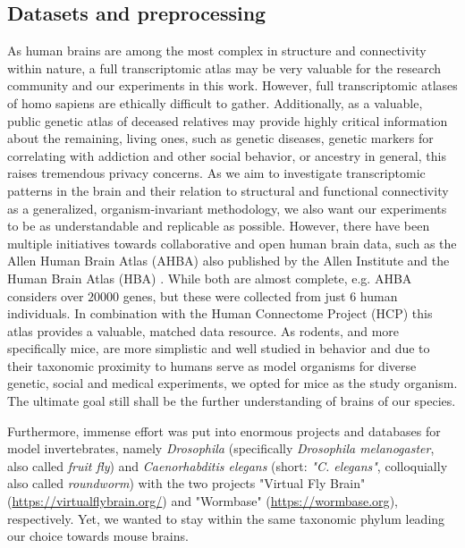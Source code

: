 \documentclass[]{article}
\renewcommand{\cite}{\citep}
\begin{document}
\subsection{Datasets and preprocessing}
\label{sec:datasets}
As human brains are among the most complex in structure and connectivity within nature, a full transcriptomic atlas may be very valuable for the research community and our experiments in this work. However, full transcriptomic atlases of homo sapiens are ethically difficult to gather. Additionally, as a valuable, public genetic atlas of deceased relatives may provide highly critical information about the remaining, living ones, such as genetic diseases, genetic markers for correlating with addiction and other social behavior, or ancestry in general, this raises tremendous privacy concerns. As we aim to investigate transcriptomic patterns in the brain and their relation to structural and functional connectivity as a generalized, organism-invariant methodology, we also want our experiments to be as understandable and replicable as possible. 
However, there have been multiple initiatives towards collaborative and open human brain data, such as the Allen Human Brain Atlas (AHBA) \cite{hawrylycz_digital_2011} also published by the Allen Institute and the Human Brain Atlas (HBA) \cite{roland1994human}. While both are almost complete, e.g. AHBA considers over $20000$ genes, but these were collected from just 6 human individuals. In combination with the Human Connectome Project (HCP) \cite{van2013wu} this atlas provides a valuable, matched data resource. As rodents, and more specifically mice, are more simplistic and well studied in behavior and due to their taxonomic proximity to humans serve as model organisms for diverse genetic, social and medical experiments, we opted for mice as the study organism. The ultimate goal still shall be the further understanding of brains of our species.

Furthermore, immense effort was put into enormous projects and databases for model invertebrates, namely \textit{Drosophila} (specifically \textit{Drosophila melanogaster}, also called \textit{fruit fly}) and \textit{Caenorhabditis elegans} (short: \textit{"C. elegans"}, colloquially also called \textit{roundworm}) with the two projects "Virtual Fly Brain" \cite{milyaev2012virtual} (\href{https://virtualflybrain.org/}{https://virtualflybrain.org/}) and "Wormbase" \cite{lee2003building, davis2022wormbase} (\href{https://wormbase.org}{https://wormbase.org}), respectively. Yet, we wanted to stay within the same taxonomic phylum leading our choice towards mouse brains.\\
\end{document}

